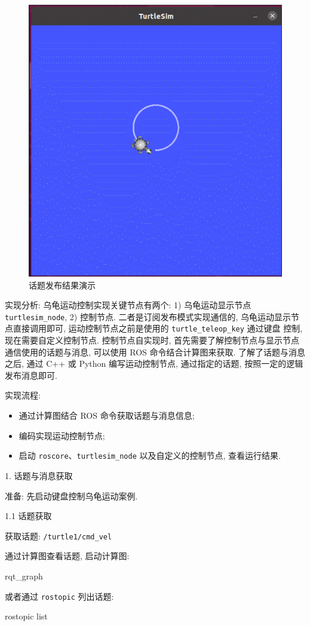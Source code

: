 \documentclass[openany, fontset=windowsold]{ctexbook}
\theoremstyle{kaiti}
\theoremstyle{normal}
\begin{document}
\begin{figure}[!ht]
  \centering
  \includegraphics[width=.5\textwidth]{ros_demo_publish_topic.png}
  \caption{话题发布结果演示}
  \label{fig:ros_demo_publish_topic}
\end{figure}

实现分析: 乌龟运动控制实现关键节点有两个: 1) 乌龟运动显示节点 \verb|turtlesim_node|, 2) 控制节点.  二者是订阅发布模式实现通信的, 乌龟运动显示节点直接调用即可, 运动控制节点之前是使用的 \verb|turtle_teleop_key| 通过键盘 控制, 现在需要自定义控制节点. 控制节点自实现时, 首先需要了解控制节点与显示节点通信使用的话题与消息, 可以使用 ROS 命令结合计算图来获取. 了解了话题与消息之后, 通过 C++ 或 Python 编写运动控制节点, 通过指定的话题, 按照一定的逻辑发布消息即可.

实现流程:

\begin{itemize}
  \item 通过计算图结合 ROS 命令获取话题与消息信息;
  \item 编码实现运动控制节点;
  \item 启动 \verb|roscore|、\verb|turtlesim_node| 以及自定义的控制节点, 查看运行结果.
\end{itemize}

1. 话题与消息获取

准备: 先启动键盘控制乌龟运动案例.

1.1 话题获取

获取话题: \verb|/turtle1/cmd_vel|

通过计算图查看话题, 启动计算图:

\begin{bash}
  rqt_graph
\end{bash}

或者通过 \verb|rostopic| 列出话题:

\begin{bash}
  rostopic list
\end{bash}
\end{document}
